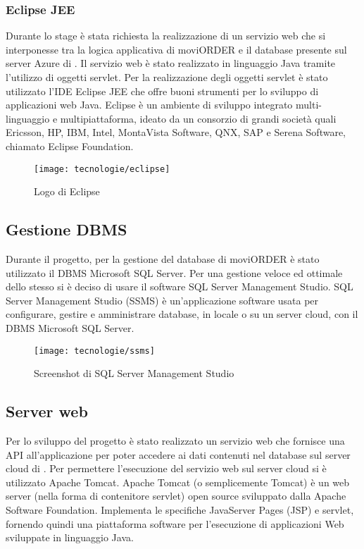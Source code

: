 \subsubsection{Eclipse JEE}

Durante lo stage è stata richiesta la realizzazione di un servizio web che si interponesse tra la logica applicativa di moviORDER e il database presente sul server Azure di \visione{}. Il servizio web è stato realizzato in linguaggio Java tramite l'utilizzo di oggetti servlet. Per la realizzazione degli oggetti servlet è stato utilizzato l'IDE Eclipse JEE che offre buoni strumenti per lo sviluppo di applicazioni web Java. Eclipse è un ambiente di sviluppo integrato multi-linguaggio e multipiattaforma, ideato da un consorzio di grandi società quali Ericsson, HP, IBM, Intel, MontaVista Software, QNX, SAP e Serena Software, chiamato Eclipse Foundation.

\begin{figure}[!h] 
    \centering 
    \texttt{[image: tecnologie/eclipse]} 
    \caption{Logo di Eclipse}
\end{figure}

\subsection{Gestione DBMS}

Durante il progetto, per la gestione del database di moviORDER è stato utilizzato il DBMS Microsoft SQL Server. Per una gestione veloce ed ottimale dello stesso si è deciso di usare il software SQL Server Management Studio. SQL Server Management Studio (SSMS) è un'applicazione software usata per configurare, gestire e amministrare database, in locale o su un server cloud, con il DBMS Microsoft SQL Server. 

\begin{figure}[!h] 
    \centering 
    \texttt{[image: tecnologie/ssms]} 
    \caption{Screenshot di SQL Server Management Studio}
\end{figure}

\newpage

\subsection{Server web}

Per lo sviluppo del progetto è stato realizzato un servizio web che fornisce una API all'applicazione per poter accedere ai dati contenuti nel database sul server cloud di \visione{}. Per permettere l'esecuzione del servizio web sul server cloud si è utilizzato Apache Tomcat. Apache Tomcat (o semplicemente Tomcat) è un web server (nella forma di contenitore servlet) open source sviluppato dalla Apache Software Foundation. Implementa le specifiche JavaServer Pages (JSP) e servlet, fornendo quindi una piattaforma software per l'esecuzione di applicazioni Web sviluppate in linguaggio Java.

